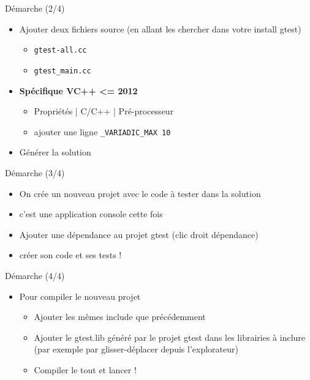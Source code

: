 \begin{frame}{Démarche (2/4)}
  \begin{itemize}
    \item Ajouter deux fichiers source (en allant les chercher dans votre install gtest)
    \begin{itemize}
      \item \texttt{gtest-all.cc}
      \item \texttt{gtest\_main.cc}
    \end{itemize}
    \item \textbf{Spécifique VC++ <= 2012}
    \begin{itemize}
      \item Propriétés | C/C++ | Pré-processeur
      \item ajouter une ligne \texttt{\_VARIADIC\_MAX 10}
    \end{itemize}
    \item Générer la solution
  \end{itemize}
\end{frame}

\begin{frame}{Démarche (3/4)}
  \begin{itemize}
    \item On crée un nouveau projet avec le code à tester dans la solution
    \item c'est une application console cette fois
    \item Ajouter une dépendance au projet gtest (clic droit dépendance)
    \item créer son code et ses tests !
  \end{itemize}
\end{frame}

\begin{frame}{Démarche (4/4)}
  \begin{itemize}
    \item Pour compiler le nouveau projet
    \begin{itemize}
      \item Ajouter les mêmes include que précédemment
      \item Ajouter le gtest.lib généré par le projet gtest dans les librairies à inclure (par exemple par glisser-déplacer depuis l'explorateur)
      \item Compiler le tout et lancer !
    \end{itemize}
  \end{itemize}
\end{frame}
